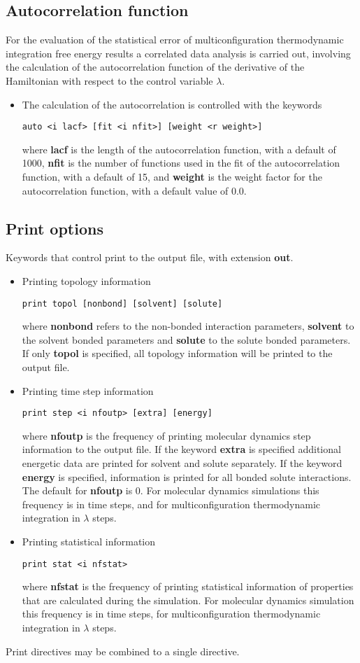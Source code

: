 \subsection{Autocorrelation function}
For the evaluation of the statistical error of multiconfiguration
thermodynamic integration free energy results a correlated data 
analysis is carried out, involving the calculation of the
autocorrelation function of the derivative of the Hamiltonian with
respect to the control variable $\lambda$.
\begin{itemize}
\item 
The calculation of the autocorrelation is controlled with the keywords
\begin{verbatim}
auto <i lacf> [fit <i nfit>] [weight <r weight>]
\end{verbatim}
where {\bf lacf} is the length of the autocorrelation function, with
a default of 1000, {\bf nfit} is the number of functions used in the
fit of the autocorrelation function, with a default of 15, and
{\bf weight} is the weight factor for the autocorrelation function,
with a default value of 0.0.
\end{itemize}
\subsection{Print options}
Keywords that control print to the output file, with extension {\bf out}.
\begin{itemize}
\item
Printing topology information
\begin{verbatim}
print topol [nonbond] [solvent] [solute]
\end{verbatim}
where {\bf nonbond} refers to the non-bonded interaction parameters,
{\bf solvent} to the solvent bonded parameters and {\bf solute} to the
solute bonded parameters. If only {\bf topol} is specified, all
topology information will be printed to the output file.
\item
Printing time step information
\begin{verbatim}
print step <i nfoutp> [extra] [energy]
\end{verbatim}
where {\bf nfoutp} is the frequency of printing molecular dynamics step
information to the output file. If the keyword {\bf extra} is specified
additional energetic data are printed for solvent and solute separately.
If the keyword {\bf energy} is specified, information is printed for
all bonded solute interactions.
The default for {\bf nfoutp} is 0. For molecular dynamics simulations
this frequency is in time steps, and for multiconfiguration thermodynamic
integration in $\lambda$ steps.
\item
Printing statistical information
\begin{verbatim}
print stat <i nfstat>
\end{verbatim}
where {\bf nfstat} is the frequency of printing statistical information
of properties that are calculated during the simulation. 
For molecular dynamics simulation
this frequency is in time steps, for multiconfiguration thermodynamic
integration in $\lambda$ steps.
\end{itemize}
Print directives may be combined to a single directive.
